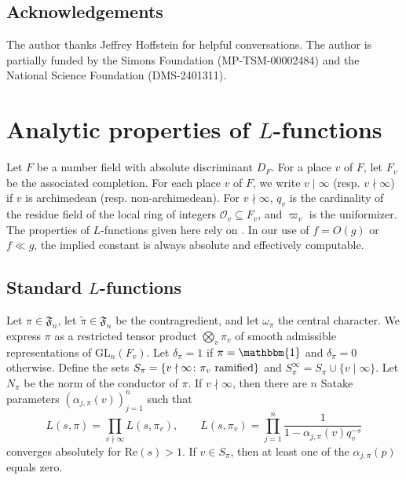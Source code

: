 \documentclass[11pt]{amsart}
\theoremstyle{remark}
\numberwithin{equation}{section}
\begin{document}
\subsection*{Acknowledgements}

The author thanks Jeffrey Hoffstein for helpful conversations.  The author is partially funded by the Simons Foundation (MP-TSM-00002484) and the National Science Foundation (DMS-2401311).


\section{Analytic properties of $L$-functions}
\label{sec:Properties}

Let $F$ be a number field with absolute discriminant $D_F$.  For a place $v$ of $F$, let $F_v$ be the associated completion.  For each place $v$ of $F$, we write $v\mid\infty$ (resp. $v\nmid \infty$) if $v$ is archimedean (resp. non-archimedean).  For $v\nmid\infty$, $q_v$ is the cardinality of the residue field of the local ring of integers $\mathcal{O}_v\subseteq F_v$, and $\varpi_v$ is the uniformizer.  The properties of $L$-functions given here rely on \cite{GodementJacquet,JPSS,MoeglinWaldspurger}.  In our use of $f=O(g)$ or $f\ll g$, the implied constant is always absolute and effectively computable.

\subsection{Standard $L$-functions}
\label{subsec:standard}

Let $\pi\in\mathfrak{F}_{n}$, let $\widetilde{\pi}\in\mathfrak{F}_{n}$ be the contragredient, and let $\omega_{\pi}$ the central character.  We express $\pi$ as a restricted tensor product $\bigotimes_v \pi_v$ of smooth admissible representations of $\mathrm{GL}_n(F_v)$.  Let $\delta_{\pi}=1$ if $\pi=\mathbbm{1}$ and $\delta_{\pi}=0$ otherwise.  Define the sets $S_{\pi}=\{v\nmid\infty\colon \textup{$\pi_v$ ramified}\}$ and $S_{\pi}^{\infty}=S_{\pi}\cup\{v\mid\infty\}$.  Let $N_{\pi}$ be the norm of the conductor of $\pi$.  If $v\nmid\infty$, then there are $n$ Satake parameters $(\alpha_{j,\pi}(v))_{j=1}^n$ such that
	\[
	L(s,\pi)=\prod_{v\nmid\infty}L(s,\pi_{v}),\qquad L(s,\pi_{v}) = \prod_{j=1}^{n}\frac{1}{1-\alpha_{j,\pi}(v)q_v^{-s}}
	\]
	converges absolutely for $\mathrm{Re}(s)>1$.  If $v\in S_{\pi}$, then at least one of the $\alpha_{j,\pi}(p)$ equals zero.
	
\end{document}
